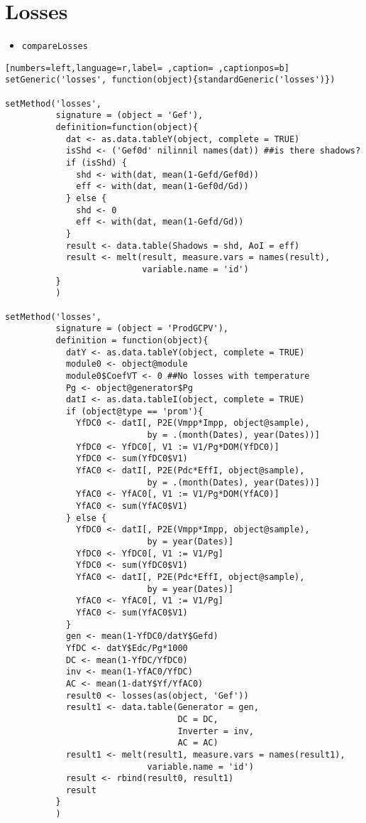 \section{Losses}
\label{sec:org9b117fc}
\begin{itemize}
\item \texttt{compareLosses}
\end{itemize}
\begin{lstlisting}[numbers=left,language=r,label= ,caption= ,captionpos=b]
setGeneric('losses', function(object){standardGeneric('losses')})

setMethod('losses',
          signature = (object = 'Gef'),
          definition=function(object){
            dat <- as.data.tableY(object, complete = TRUE)
            isShd <- ('Gef0d' nilinnil names(dat)) ##is there shadows?
            if (isShd) {
              shd <- with(dat, mean(1-Gefd/Gef0d))
              eff <- with(dat, mean(1-Gef0d/Gd))
            } else {
              shd <- 0
              eff <- with(dat, mean(1-Gefd/Gd))
            }
            result <- data.table(Shadows = shd, AoI = eff)
            result <- melt(result, measure.vars = names(result),
                           variable.name = 'id')
          }
          )

setMethod('losses',
          signature = (object = 'ProdGCPV'),
          definition = function(object){
            datY <- as.data.tableY(object, complete = TRUE)
            module0 <- object@module
            module0$CoefVT <- 0 ##No losses with temperature
            Pg <- object@generator$Pg
            datI <- as.data.tableI(object, complete = TRUE)
            if (object@type == 'prom'){
              YfDC0 <- datI[, P2E(Vmpp*Impp, object@sample),
                            by = .(month(Dates), year(Dates))]
              YfDC0 <- YfDC0[, V1 := V1/Pg*DOM(YfDC0)]
              YfDC0 <- sum(YfDC0$V1)
              YfAC0 <- datI[, P2E(Pdc*EffI, object@sample),
                            by = .(month(Dates), year(Dates))]
              YfAC0 <- YfAC0[, V1 := V1/Pg*DOM(YfAC0)]
              YfAC0 <- sum(YfAC0$V1)
            } else {
              YfDC0 <- datI[, P2E(Vmpp*Impp, object@sample),
                            by = year(Dates)]
              YfDC0 <- YfDC0[, V1 := V1/Pg]
              YfDC0 <- sum(YfDC0$V1)
              YfAC0 <- datI[, P2E(Pdc*EffI, object@sample),
                            by = year(Dates)]
              YfAC0 <- YfAC0[, V1 := V1/Pg]
              YfAC0 <- sum(YfAC0$V1)
            }
            gen <- mean(1-YfDC0/datY$Gefd)
            YfDC <- datY$Edc/Pg*1000
            DC <- mean(1-YfDC/YfDC0)
            inv <- mean(1-YfAC0/YfDC)
            AC <- mean(1-datY$Yf/YfAC0)
            result0 <- losses(as(object, 'Gef'))
            result1 <- data.table(Generator = gen,
                                  DC = DC,
                                  Inverter = inv,
                                  AC = AC)
            result1 <- melt(result1, measure.vars = names(result1),
                            variable.name = 'id')
            result <- rbind(result0, result1)
            result
          }
          )

\end{lstlisting}
